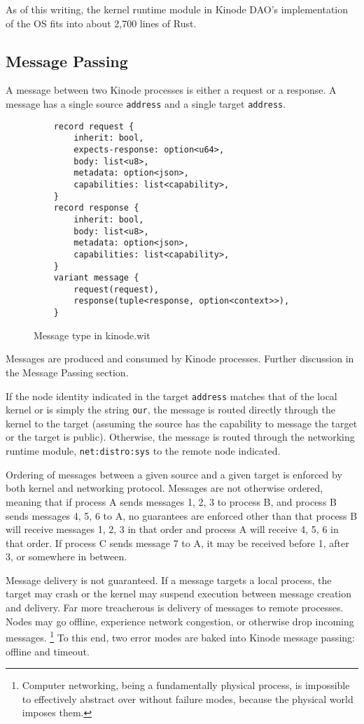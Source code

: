 \documentclass[runningheads]{llncs}
\begin{document}
As of this writing, the kernel runtime module in Kinode DAO's implementation of the OS fits into about 2,700 lines of Rust.

\subsection{Message Passing}

A message between two Kinode processes is either a request or a response.
A message has a single source \verb|address| and a single target \verb|address|.

\begin{figure}
    \centering
    \begin{lstlisting}
    record request {
        inherit: bool,
        expects-response: option<u64>,
        body: list<u8>,
        metadata: option<json>,
        capabilities: list<capability>,
    }
    record response {
        inherit: bool,
        body: list<u8>,
        metadata: option<json>,
        capabilities: list<capability>,
    }
    variant message {
        request(request),
        response(tuple<response, option<context>>),
    }
    \end{lstlisting}
    \caption{Message type in kinode.wit}
    \label{fig:WIT Types 2}
\end{figure}

Messages are produced and consumed by Kinode processes. Further discussion in the Message Passing section.

If the node identity indicated in the target \verb|address| matches that of the local kernel or is simply the string \verb|our|, the message is routed directly through the kernel to the target (assuming the source has the capability to message the target or the target is public).
Otherwise, the message is routed through the networking runtime module, \verb|net:distro:sys| to the remote node indicated.

Ordering of messages between a given source and a given target is enforced by both kernel and networking protocol.
Messages are not otherwise ordered, meaning that if process A sends messages 1, 2, 3 to process B, and process B sends messages 4, 5, 6 to A, no guarantees are enforced other than that process B will receive messages 1, 2, 3 in that order and process A will receive 4, 5, 6 in that order.
If process C sends message 7 to A, it may be received before 1, after 3, or somewhere in between.

Message delivery is not guaranteed.
If a message targets a local process, the target may crash or the kernel may suspend execution between message creation and delivery.
Far more treacherous is delivery of messages to remote processes.
Nodes may go offline, experience network congestion, or otherwise drop incoming messages.
\footnote{Computer networking, being a fundamentally physical process, is impossible to effectively abstract over without failure modes, because the physical world imposes them.}
To this end, two error modes are baked into Kinode message passing: offline and timeout.
\end{document}
